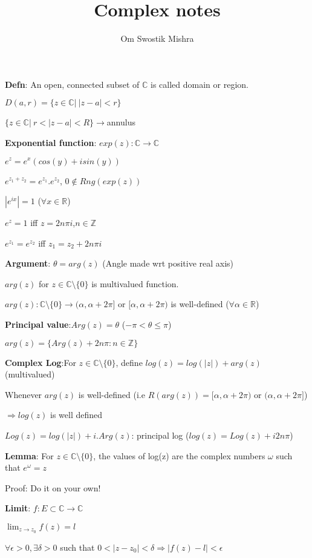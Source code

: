 \documentclass{article}
\title{Complex notes}
\author{Om Swostik Mishra}
\date{}
\begin{document}
\maketitle

\begin{flushleft}
\textbf{Defn}: An open, connected subset of $\mathds{C}$ is called domain or region.

$D(a,r)=\{z\in \mathds{C}|\: |z-a|<r\}$

$\{z\in \mathds{C}|\:r<|z-a|<R\}$$\rightarrow$annulus

\textbf{Exponential function}: $exp(z):\mathds{C}\rightarrow\mathds{C}$

$e^z=e^x(cos(y)+isin(y))$

$e^{z_1+z_2}=e^{z_1}.e^{z_2}$, $0\notin Rng(exp(z))$

$|e^{ix}|=1$ ($\forall x\in \mathds{R}$)

$e^{z}=1$ iff $z=2n\pi i$,$n\in \mathds{Z}$

$e^{z_1}=e^{z_2}$ iff $z_1=z_2+2n\pi i$

\textbf{Argument}: 
$\theta=arg(z)$ (Angle made wrt positive real axis)

$arg(z)$ for $z\in \mathds{C}\setminus \{0\}$ is multivalued function.

$arg(z): \mathds{C}\setminus \{0\}\rightarrow (\alpha,\alpha+2\pi]$ or $[\alpha,\alpha+2\pi)$ is well-defined ($\forall \alpha \in \mathds{R}$)

\textbf{Principal value}:$Arg(z)=\theta$  ($-\pi<\theta\leq \pi$)

$arg(z)=\{Arg(z)+2n\pi:n\in \mathds{Z}\}$

\textbf{Complex Log}:For $z\in \mathds{C}\setminus \{0\}$, define $log(z)=log(|z|)+arg(z)$ (multivalued)

Whenever $arg(z)$ is well-defined (i.e $R(arg(z))=[\alpha,\alpha+2\pi)$ or $(\alpha,\alpha+2\pi]$)

$\Rightarrow log(z)$ is well defined

$Log(z)=log(|z|)+i.Arg(z)$: principal log ($log(z)=Log(z)+i2n\pi$)

\textbf{Lemma}: For $z\in \mathds{C}\setminus \{0\}$, the values of log(z) are the complex numbers $\omega$ such that $e^{\omega}=z$

Proof: Do it on your own!

\textbf{Limit}: $f: E\subset\mathds{C} \rightarrow \mathds{C}$

$\lim_{z \to z_0} f(z)=l$ 

$\forall \epsilon>0,\exists \delta>0$ such that $0<|z-z_0|<\delta \Rightarrow |f(z)-l|<\epsilon$ 


\end{flushleft}
\end{document}
